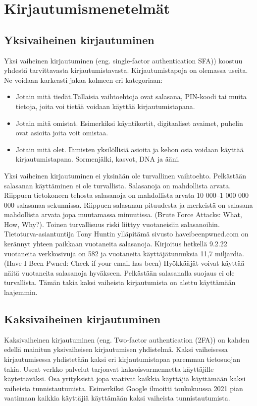\chapter{Kirjautumismenetelmät\label{kirjautumismenetelmät}}

\section{Yksivaiheinen kirjautuminen}

Yksi vaiheinen kirjautuminen (eng. single-factor authentication SFA)) koostuu yhdestä tarvittavasta kirjautumistavasta. Kirjautumistapoja on olemassa useita. Ne voidaan karkeasti jakaa kolmeen eri kategoriaan: 

\begin{itemize}
    \item Jotain mitä tiedät.Tällaisia vaihtoehtoja ovat salasana, PIN-koodi tai muita tietoja, joita voi tietää voidaan käyttää kirjautumistapana.
    \item Jotain mitä omistat. Esimerkiksi käyntikortit, digitaaliset avaimet, puhelin ovat asioita joita voit omistaa.
    \item Jotain mitä olet. Ihmisten yksilöllisiä asioita ja kehon osia voidaan käyttää kirjautumistapana. Sormenjälki, kasvot, DNA ja ääni.
\end{itemize}
Yksi vaiheinen kirjautuminen ei yksinään ole turvallinen vaihtoehto. Pelkästään salasanan käyttäminen ei ole turvallista. Salasanoja on mahdollista arvata. Riippuen tietokoneen tehosta salasanoja on mahdollista arvata 10 000–1 000 000 000 salasanaa sekunnissa. Riippuen salasanan pituudesta ja merkeistä on salasana mahdollista arvata jopa muutamassa minuutissa. (Brute Force Attacks: What, How, Why?). Toinen turvallisuus riski liittyy vuotaneisiin salasanoihin. Tietoturva-asiantuntija Tony Huntin ylläpitämä sivusto haveibeenpwned.com on kerännyt yhteen paikkaan vuotaneita salasanoja. Kirjoitus hetkellä 9.2.22 vuotaneita verkkosivuja on 582 ja vuotaneita käyttäjätunnuksia 11,7 miljardia. (Have I Been Pwned: Check if your email has been) Hyökkääjät voivat käyttää näitä vuotaneita salasanoja hyväkseen. Pelkästään salasanalla suojaus ei ole turvallista. Tämän takia kaksi vaiheista kirjautumista on alettu käyttämään laajemmin. 

\section{Kaksivaiheinen kirjautuminen}
Kaksivaiheinen kirjautuminen (eng. Two-factor authentication (2FA)) on kahden edellä mainitun yksivaiheisen kirjautumisen yhdistelmä. Kaksi vaiheisessa kirjautumisessa yhdistetään kaksi eri kirjautumistapaa paremman tietosuojan takia. 
Useat verkko palvelut tarjoavat kaksoisvarmennetta käyttäjille käytettäväksi. Osa yrityksistä jopa vaativat kaikkia käyttäjiä käyttämään kaksi vaiheista tunnistautumista. Esimerkiksi Google ilmoitti toukokuussa 2021 pian vaatimaan kaikkia käyttäjiä käyttämään kaksi vaiheista tunnistautumista. \citep{future_without_passwords}


